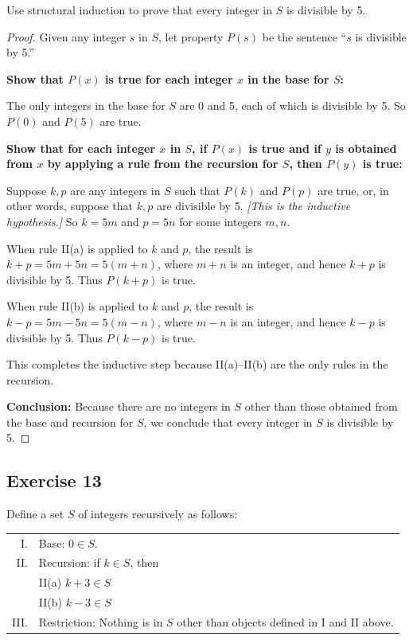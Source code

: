 \documentclass[14pt]{extarticle}
\begin{document}
Use structural induction to prove that every integer in $S$ is divisible by 5.

\begin{proof}
Given any integer $s$ in $S$, let property $P(s)$ be the sentence “$s$ is divisible by 5.” 

{\bf Show that $P(x)$ is true for each integer $x$ in the base for $S$:}

The only integers in the base for $S$ are 0 and 5, each of which is divisible by 5. So $P(0)$ and $P(5)$ are true. 

{\bf Show that for each integer $x$ in $S$, if $P(x)$ is true and if $y$ is obtained from $x$ by applying a rule 
from the recursion for $S$, then $P(y)$ is true:}

Suppose $k, p$ are any integers in $S$ such that $P(k)$ and $P(p)$ are true, or, in other words, suppose that $k, p$ 
are divisible by 5. {\it [This is the inductive hypothesis.]} So $k = 5m$ and $p = 5n$ for some integers $m, n$.

When rule II(a) is applied to $k$ and $p$, the result is $k+p = 5m+5n = 5(m+n)$, where $m+n$ is an integer, and 
hence $k+p$ is divisible by 5. Thus $P(k+p)$ is true.

When rule II(b) is applied to $k$ and $p$, the result is $k-p = 5m-5n = 5(m-n)$, where $m-n$ is an integer, and 
hence $k-p$ is divisible by 5. Thus $P(k-p)$ is true.

This completes the inductive step because II(a)–II(b) are the only rules in the recursion.

{\bf Conclusion:} Because there are no integers in $S$ other than those obtained from the base and recursion for 
$S$, we conclude that every integer in $S$ is divisible by 5.
\end{proof}

\subsection{Exercise 13}
Define a set $S$ of integers recursively as follows:

\begin{tabular}{rl}
I. & Base: $0 \in S$. \\
II. & Recursion: if $k \in S$, then \\
    & II(a) $k+3 \in S$ \\
    & II(b) $k-3 \in S$ \\
III. & Restriction: Nothing is in $S$ other than objects defined in I and II above.
\end{tabular}
\end{document}
